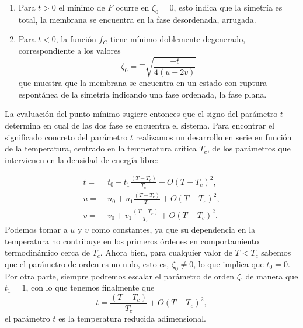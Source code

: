 \begin{enumerate}
\item Para $t>0$ el mínimo de $F$ ocurre en $\zeta_0=0$, esto indica que la
  simetría es total, la membrana se encuentra en la fase desordenada,
  arrugada.
\item Para $t<0$, la función $f_C$ tiene mínimo doblemente
  degenerado, correspondiente a los valores
  \begin{equation}\label{zeta_0}
    \zeta_0=\mp \sqrt{\frac{-t}{4(u+2v)}}
  \end{equation}
  que muestra que la membrana se encuentra en un estado con ruptura espontánea
  de la simetría indicando una fase ordenada, la fase plana. 
\end{enumerate}

La evaluación del punto mínimo sugiere entonces que el
signo del parámetro $t$ determina en cual de las dos fase se encuentra el
sistema. Para encontrar el significado concreto del parámetro $t$
realizamos un desarrollo en serie en función de la temperatura, centrado en la
temperatura crítica $T_c$, de los parámetros que intervienen en la densidad
de energía libre:

\begin{align*}
t=&\; t_0+t_1\frac{(T-T_c)}{T_c}+O(T-T_c)^2,\\
u=&\; u_0+u_1\frac{(T-T_c)}{T_c}+O(T-T_c)^2,\\
v=&\; v_0+v_1\frac{(T-T_c)}{T_c}+O(T-T_c)^2.
\end{align*}
Podemos tomar a $u$ y $v$ como constantes, ya que su dependencia en la 
temperatura no contribuye en los primeros órdenes en comportamiento
termodinámico cerca de $T_c$. Ahora bien,
para cualquier valor de $T\!<\!T_c$ sabemos que el parámetro de orden es no
nulo, esto es, $\zeta_0\!\neq\! 0$, lo que implica que $t_0=0$. Por otra
parte, siempre podremos escalar el parámetro de orden 
$\zeta$, de manera que $t_1=1$, con lo que tenemos finalmente que
\begin{equation*}
t=\frac{(T-T_c)}{T_c}+O(T-T_c)^2,
\end{equation*}
el parámetro $t$ es la temperatura reducida adimensional.


 
